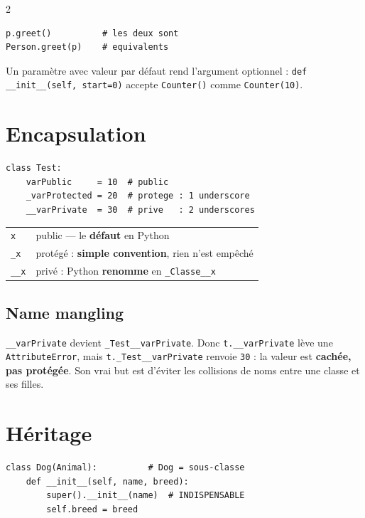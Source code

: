 \documentclass[a4paper,10pt]{article}
\newcommand{\co}[1]{\texttt{\textcolor{codefg}{#1}}}
\begin{document}
\begin{multicols}{2}
\begin{lstlisting}
p.greet()          # les deux sont
Person.greet(p)    # equivalents
\end{lstlisting}

Un paramètre avec valeur par défaut rend l'argument optionnel :
\co{def \_\_init\_\_(self, start=0)} accepte \co{Counter()} comme
\co{Counter(10)}.

\section{Encapsulation}

\begin{lstlisting}
class Test:
    varPublic     = 10  # public
    _varProtected = 20  # protege : 1 underscore
    __varPrivate  = 30  # prive   : 2 underscores
\end{lstlisting}

\begin{tabularx}{\linewidth}{@{}l>{\raggedright\arraybackslash}X@{}}
\toprule
\co{x}      & public --- le \textbf{défaut} en Python \\
\co{\_x}    & protégé : \textbf{simple convention}, rien n'est empêché \\
\co{\_\_x}  & privé : Python \textbf{renomme} en \co{\_Classe\_\_x} \\
\bottomrule
\end{tabularx}

\subsection{Name mangling}
\co{\_\_varPrivate} devient \co{\_Test\_\_varPrivate}. Donc
\co{t.\_\_varPrivate} lève une \co{AttributeError}, mais
\co{t.\_Test\_\_varPrivate} renvoie \co{30} : la valeur est
\textbf{cachée, pas protégée}. Son vrai but est d'éviter les collisions de
noms entre une classe et ses filles.

\section{Héritage}

\begin{lstlisting}
class Dog(Animal):          # Dog = sous-classe
    def __init__(self, name, breed):
        super().__init__(name)  # INDISPENSABLE
        self.breed = breed


\end{lstlisting}
\end{multicols}
\end{document}
